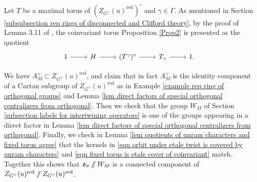\documentclass[10pt]{article}
\def\onto{\mathrel{\twoheadrightarrow}}
\newcommand{\git}{\mathbin{
  \mathchoice{/\mkern-6mu/}%
    {/\mkern-6mu/}%
    {/\mkern-5mu/}%
    {/\mkern-5mu/}}}%
\newcommand{\X}{\mathcal{X}}
\theoremstyle{definition}
\theoremstyle{remark}
\newcommand{\Zur}{Z_{G^\vee}(u)^{\mathrm{red}}}
\begin{document}
Let $T$ be a maximal torus of $(\Zur)^\circ$ and $\gamma\in\Gamma$. 
As mentioned in Section \ref{subsubsection rep rings of disconnected and Clifford theory}, by the proof of Lemma 3.11 of \cite{diss}, the coinvariant torus Proposition \ref{Prop2} is presented as the quotient
%
\begin{equation}
\label{eqn fixed torus is etale cover of coinvariant}
\begin{tikzcd}
1\arrow[r]&H\arrow[r]&(T^\gamma)^\circ\arrow[r]&T_{\gamma}\arrow[r]&1.
\end{tikzcd}
\end{equation}

We have $A^\vee_M\subset\Zur$, and claim that in fact $A^\vee_M$ is the identity 
component of a Cartan subgroup of $\Zur$ as in Example \ref{example rep ring of orthogonal groups} and
Lemma \ref{lem direct factors of special orthogonal centralizers from orthogonal}. 
Then we check that the 
group $W_M$ of Section \ref{subsection labels for intertwining operators} is one of the groups appearing in a 
direct factor in Lemma \ref{lem direct factors of special orthogonal centralizers from orthogonal}. 
Finally, we check in Lemma \ref{lem quotients of unram characters and fixed torus agree} that the kernels in \eqref{eqn orbit under etale twist is covered by unram characters} and \eqref{eqn fixed torus is etale cover of coinvariant} match. Together this shows that $\mathfrak{o}_\sigma\git W_M$ is a connected component of $\Zur\git\Zur$. 

%
%
\end{document}
